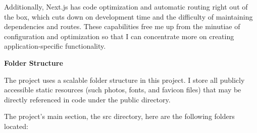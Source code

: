\par Additionally, Next.js has code optimization and automatic routing right out of the box, which cuts down on development time and the difficulty of maintaining dependencies and routes. These capabilities free me up from the minutiae of configuration and optimization so that I can concentrate more on creating application-specific functionality.

\par \textbf{Folder Structure}
\par The project uses a scalable folder structure in this project. I store all publicly accessible static resources (such photos, fonts, and favicon files) that may be directly referenced in code under the public directory.
\par The project's main section, the src directory, here are the following folders located:
